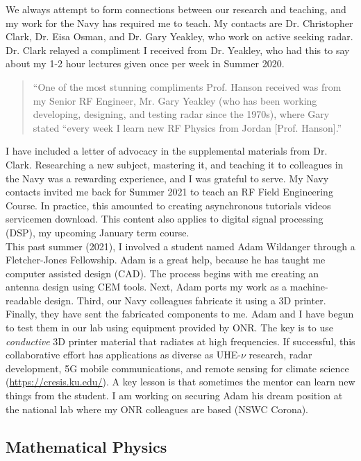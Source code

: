 \documentclass[../../../main.tex]{subfiles}
\begin{document}
We always attempt to form connections between our research and teaching, and my work for the Navy has required me to teach.  My contacts are Dr. Christopher Clark, Dr. Eisa Osman, and Dr. Gary Yeakley, who work on active seeking radar.  Dr. Clark relayed a compliment I received from Dr. Yeakley, who had this to say about my 1-2 hour lectures given once per week in Summer 2020.
\begin{quote}
``One of the most stunning compliments Prof. Hanson received was from my Senior RF Engineer, Mr. Gary Yeakley (who has been working developing, designing, and testing radar since the 1970s), where Gary stated ``every week I learn new RF Physics from Jordan [Prof. Hanson].''
\end{quote}
I have included a letter of advocacy in the supplemental materials from Dr. Clark.  Researching a new subject, mastering it, and teaching it to colleagues in the Navy was a rewarding experience, and I was grateful to serve.  My Navy contacts invited me back for Summer 2021 to teach an RF Field Engineering Course.  In practice, this amounted to creating asynchronous tutorials videos servicemen download.  This content also applies to digital signal processing (DSP), my upcoming January term course.
\\
\vspace{0.15cm}
This past summer (2021), I involved a student named Adam Wildanger through a Fletcher-Jones Fellowship.  Adam is a great help, because he has taught me computer assisted design (CAD).  The process begins with me creating an antenna design using CEM tools.  Next, Adam ports my work as a machine-readable design.  Third, our Navy colleagues fabricate it using a 3D printer.  Finally, they have sent the fabricated components to me.  Adam and I have begun to test them in our lab using equipment provided by ONR.  The key is to use \textit{conductive} 3D printer material that radiates at high frequencies.  If successful, this collaborative effort has applications as diverse as UHE-$\nu$ research, radar development, 5G mobile communications, and remote sensing for climate science (\url{https://cresis.ku.edu/}).  A key lesson is that sometimes the mentor can learn new things from the student.  I am working on securing Adam his dream position at the national lab where my ONR colleagues are based (NSWC Corona).

\subsection{Mathematical Physics}
\label{sec:math_phys}
\end{document}
